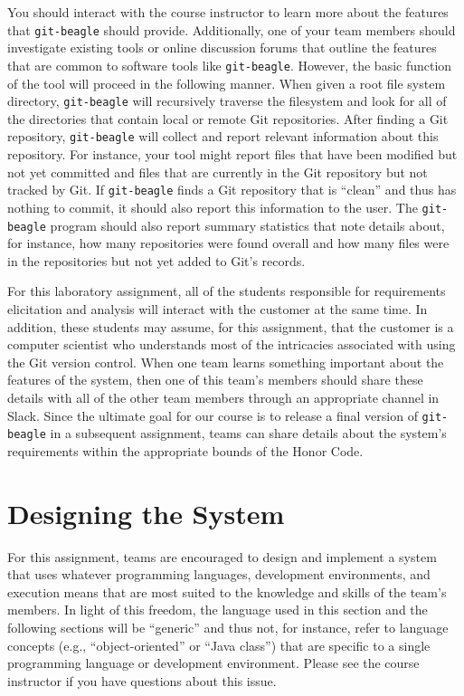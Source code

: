 You should interact with the course instructor to learn more about the features that {\tt git-beagle} should provide.
Additionally, one of your team members should investigate existing tools or online discussion forums that outline the
features that are common to software tools like {\tt git-beagle}. However, the basic function of the tool will proceed
in the following manner. When given a root file system directory, {\tt git-beagle} will recursively traverse the
filesystem and look for all of the directories that contain local or remote Git repositories. After finding a Git
repository, {\tt git-beagle} will collect and report relevant information about this repository. For instance, your tool
might report files that have been modified but not yet committed and files that are currently in the Git repository but
not tracked by Git. If {\tt git-beagle} finds a Git repository that is ``clean'' and thus has nothing to commit, it
should also report this information to the user. The {\tt git-beagle} program should also report summary statistics that
note details about, for instance, how many repositories were found overall and how many files were in the repositories
but not yet added to Git's records.

For this laboratory assignment, all of the students responsible for requirements elicitation and analysis will interact
with the customer at the same time. In addition, these students may assume, for this assignment, that the customer is a
computer scientist who understands most of the intricacies associated with using the Git version control. When one team
learns something important about the features of the system, then one of this team's members should share these details
with all of the other team members through an appropriate channel in Slack. Since the ultimate goal for our course is to
release a final version of {\tt git-beagle} in a subsequent assignment, teams can share details about the system's
requirements within the appropriate bounds of the Honor Code.

\section*{Designing the System}

For this assignment, teams are encouraged to design and implement a system that uses whatever programming languages,
development environments, and execution means that are most suited to the knowledge and skills of the team's members. 
In light of this freedom, the language used in this section and the following sections will be ``generic'' and thus not,
for instance, refer to language concepts (e.g., ``object-oriented'' or ``Java class'') that are specific to a single
programming language or development environment. Please see the course instructor if you have questions about this
issue.

